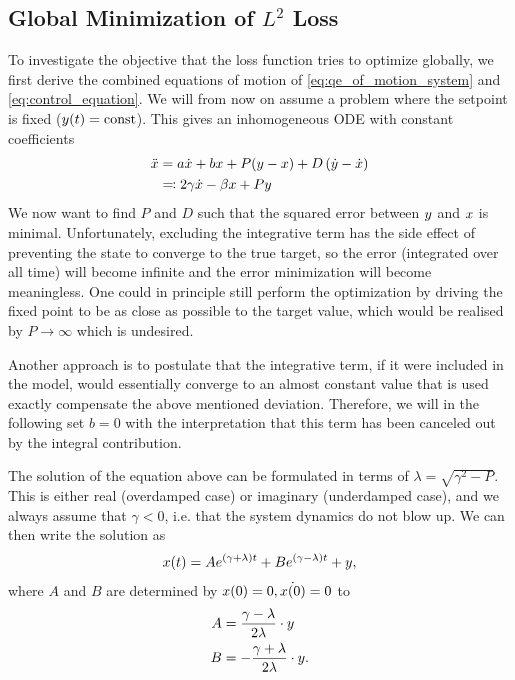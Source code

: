 \documentclass{article}
\begin{document}
  \subsection{Global Minimization of \texorpdfstring{$L^2$}{L2} Loss}
    \label{sq:L2Loss}
    To investigate the objective that the loss function tries to optimize globally, we first derive the combined 
    equations of motion of \eqref{eq:qe_of_motion_system} and \eqref{eq:control_equation}.
    We will from now on assume a problem where the setpoint is fixed ($y(t) = \operatorname{const}$).
    This gives an inhomogeneous ODE with constant coefficients 
    \begin{align}
        \ddot{x} &= a \dot{x} + b x + P (y - x) + D \left( \dot{y} - \dot{x} \right)\\ \nonumber
        &\eqqcolon 2\gamma  \dot{x} - \beta x + P y
    \end{align}
    We now want to find $P$ and $D$ such that the squared error between $y$ and $x$ is minimal.
    Unfortunately, excluding the integrative term has the side effect of preventing the state to converge to the true target, so the error (integrated over all time) will become infinite and the error minimization will become meaningless. 
    One could in principle still perform the optimization by driving the fixed point to be as close as possible to the target value, which would be realised by $P \rightarrow \infty$ which is undesired. 
    
    Another approach is to postulate that the integrative term, if it were included in the model, would essentially converge to an almost constant value that is used exactly compensate the above mentioned deviation.
    Therefore, we will in the following set $b=0$ with the interpretation that this term has been canceled out by the integral contribution.

    The solution of the equation above can be formulated in terms of $\lambda=\sqrt{\gamma^2-P}$. This is either real
    (overdamped case) or imaginary (underdamped case), and we always assume that $\gamma<0$, i.e. that the system 
    dynamics do not blow up. We can then write the solution as
    \begin{align}
        x(t) = A e^{(\gamma + \lambda) t} + B e^{(\gamma - \lambda) t} + y,   
    \end{align}
    where $A$ and $B$ are determined by $x(0) = 0, \dot{x(0)} = 0$ to
    \begin{align}
        A &= \frac{\gamma - \lambda}{2\lambda} \cdot y\\
        B &= -\frac{\gamma + \lambda}{2\lambda} \cdot y.
    \end{align}
\end{document}

